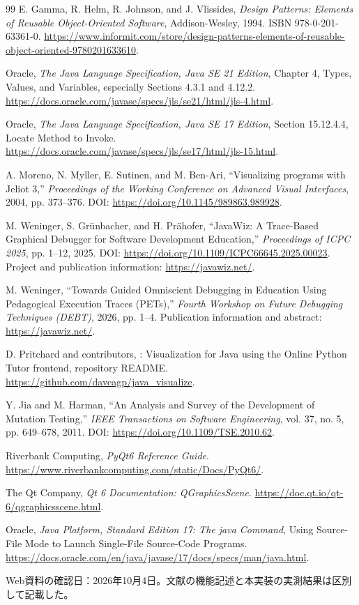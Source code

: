 \documentclass[a4paper,11pt]{ltjsarticle}
\newcommand{\code}[1]{\texttt{\detokenize{#1}}}
\begin{document}
\begin{thebibliography}{99}
E. Gamma, R. Helm, R. Johnson, and J. Vlissides,
\textit{Design Patterns: Elements of Reusable Object-Oriented Software},
Addison-Wesley, 1994. ISBN 978-0-201-63361-0.
\url{https://www.informit.com/store/design-patterns-elements-of-reusable-object-oriented-9780201633610}.

Oracle, \textit{The Java Language Specification, Java SE 21 Edition},
Chapter 4, Types, Values, and Variables, especially Sections 4.3.1 and 4.12.2.
\url{https://docs.oracle.com/javase/specs/jls/se21/html/jls-4.html}.

Oracle, \textit{The Java Language Specification, Java SE 17 Edition},
Section 15.12.4.4, Locate Method to Invoke.
\url{https://docs.oracle.com/javase/specs/jls/se17/html/jls-15.html}.

A. Moreno, N. Myller, E. Sutinen, and M. Ben-Ari,
``Visualizing programs with Jeliot 3,''
\textit{Proceedings of the Working Conference on Advanced Visual Interfaces},
2004, pp. 373--376. DOI: \url{https://doi.org/10.1145/989863.989928}.

M. Weninger, S. Gr\"unbacher, and H. Pr\"ahofer,
``JavaWiz: A Trace-Based Graphical Debugger for Software Development Education,''
\textit{Proceedings of ICPC 2025}, pp. 1--12, 2025.
DOI: \url{https://doi.org/10.1109/ICPC66645.2025.00023}.
Project and publication information: \url{https://javawiz.net/}.

M. Weninger, ``Towards Guided Omniscient Debugging in Education Using Pedagogical Execution Traces (PETs),''
\textit{Fourth Workshop on Future Debugging Techniques (DEBT)}, 2026, pp. 1--4.
Publication information and abstract: \url{https://javawiz.net/}.

D. Pritchard and contributors,
\code{java_visualize}: Visualization for Java using the Online Python Tutor frontend,
repository README. \url{https://github.com/daveagp/java_visualize}.

Y. Jia and M. Harman, ``An Analysis and Survey of the Development of Mutation Testing,''
\textit{IEEE Transactions on Software Engineering}, vol. 37, no. 5, pp. 649--678, 2011.
DOI: \url{https://doi.org/10.1109/TSE.2010.62}.

Riverbank Computing, \textit{PyQt6 Reference Guide}.
\url{https://www.riverbankcomputing.com/static/Docs/PyQt6/}.

The Qt Company, \textit{Qt 6 Documentation: QGraphicsScene}.
\url{https://doc.qt.io/qt-6/qgraphicsscene.html}.

Oracle, \textit{Java Platform, Standard Edition 17: The java Command},
Using Source-File Mode to Launch Single-File Source-Code Programs.
\url{https://docs.oracle.com/en/java/javase/17/docs/specs/man/java.html}.
\end{thebibliography}
\noindent Web資料の確認日：2026年10月4日。文献の機能記述と本実装の実測結果は区別して記載した。
\end{document}
